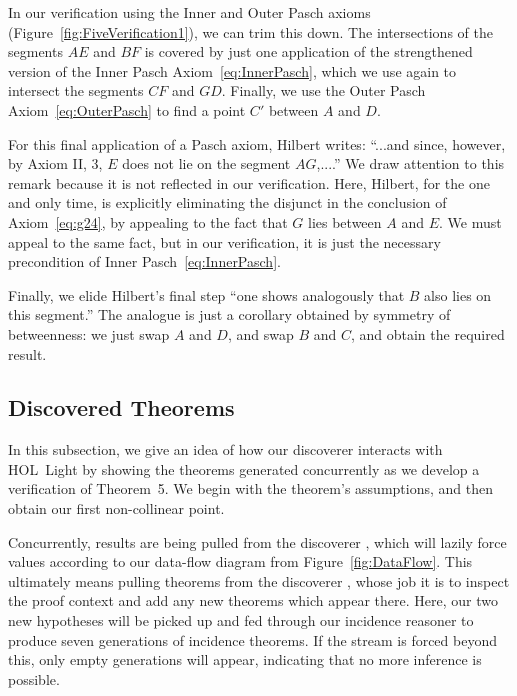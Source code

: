 In our verification using the Inner and Outer Pasch axioms (Figure~\ref{fig:FiveVerification1}), we can trim this down. The intersections of the segments $AE$ and $BF$ is covered by just one application of the strengthened version of the Inner Pasch Axiom~\eqref{eq:InnerPasch}, which we use again to intersect the segments $CF$ and $GD$. Finally, we use the Outer Pasch Axiom~\eqref{eq:OuterPasch} to find a point $C'$ between $A$ and $D$. 

For this final application of a Pasch axiom, Hilbert writes: ``...and since, however, by Axiom II, 3, $E$ does not lie on the segment $AG$,....'' We draw attention to this remark because it is not reflected in our verification. Here, Hilbert, for the one and only time, is explicitly eliminating the disjunct in the conclusion of Axiom~\ref{eq:g24}, by appealing to the fact that $G$ lies between $A$ and $E$. We must appeal to the same fact, but in our verification, it is just the necessary precondition of Inner Pasch~\eqref{eq:InnerPasch}.

Finally, we elide Hilbert's final step ``one shows analogously that $B$ also lies on this segment.'' The analogue is just a corollary obtained by symmetry of betweenness: we just swap $A$ and $D$, and swap $B$ and $C$, and obtain the required result.

\subsection{Discovered Theorems}
In this subsection, we give an idea of how our discoverer interacts with HOL~Light by showing the theorems generated concurrently as we develop a verification of Theorem~5. We begin with the theorem's assumptions, and then obtain our first non-collinear point.

\linebreak

Concurrently, results are being pulled from the discoverer , which will lazily force values according to our data-flow diagram from Figure~\ref{fig:DataFlow}. This ultimately means pulling theorems from the discoverer , whose job it is to inspect the proof context and add any new theorems which appear there. Here, our two new hypotheses will be picked up and fed through our incidence reasoner to produce seven generations of incidence theorems. If the stream is forced beyond this, only empty generations will appear, indicating that no more inference is possible.

